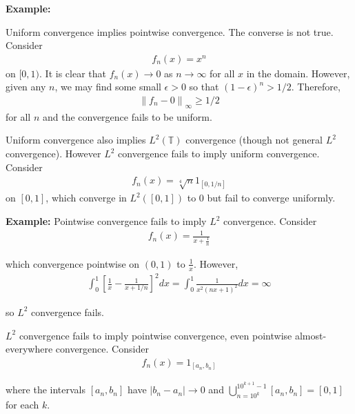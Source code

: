 \documentclass{article}
\newcommand{\bT}{\mathbb{T}}
\newcommand{\norm}[1]{{ \lVert {#1} \rVert}}
\begin{document}
	\vspace{1 cm}
	\textbf{Example:}
	
	Uniform convergence implies pointwise convergence. The converse is not true. Consider 
	\begin{align*}
		f_{n}(x) = x^{n}
	\end{align*}
	on $[0,1)$. It is clear that $f_{n}(x) \to 0$ as $n \to \infty$ for all $x$ in the domain. However, given any $n$, we may find some small $\epsilon > 0$ so that $(1-\epsilon)^{n} > 1/2$. Therefore, 
	\begin{align*}
		\norm{f_{n} - 0}_{\infty} \geq 1/2
	\end{align*}
	for all $n$ and the convergence fails to be uniform. 
	
	
	Uniform convergence also implies $L^{2}(\bT)$ convergence (though not general $L^{2}$ convergence). However $L^{2}$ convergence fails to imply uniform convergence. Consider 
	\begin{align*}
		f_{n}(x) = \sqrt[4]{n} 1_{[0,1/n]}
	\end{align*}
	on $[0,1]$, which converge in $L^{2}([0,1])$ to $0$ but fail to converge uniformly. 
	
	\vspace{1 cm}
	
	\textbf{Example:} 
	Pointwise convergence fails to imply $L^{2}$ convergence. Consider 
	\begin{align*}
		f_{n}(x) = \frac{1}{x + \frac{1}{n}}
	\end{align*} 
	
	which convergence pointwise on $(0,1)$ to $\frac{1}{x}$. However, 
	\begin{align*}
		\int_{0}^{1} \left[ \frac{1}{x} - \frac{1}{x + 1/n} \right]^{2} dx = \int_{0}^{1} \frac{1}{x^{2}(nx+1)^{2}}dx = \infty
	\end{align*}
	
	so $L^{2}$ convergence fails. 
	
	
	$L^{2}$ convergence fails to imply pointwise convergence, even pointwise almost-everywhere convergence. Consider 
	\begin{align*}
		f_{n}(x) = 1_{[a_{n},b_{n}]}
	\end{align*}
	
	where the intervals $[a_n,b_n]$ have $|b_{n} - a_{n}| \to 0$ and $\bigcup_{n=10^{k}}^{10^{k+1}-1} [a_{n},b_{n}] = [0,1]$ for each $k$. 
	
	\vspace{1 cm}
	
\end{document}
